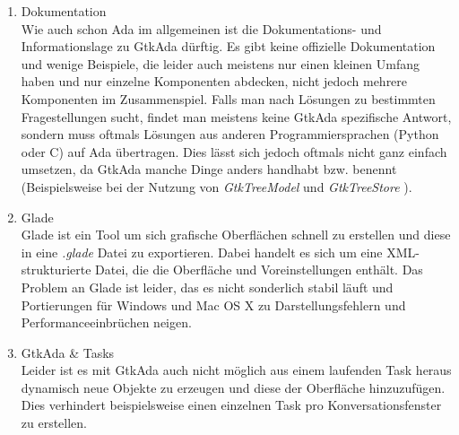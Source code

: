\documentclass[12pt,a4paper,bibliography=totocnumbered,listof=totocnumbered]{scrartcl}
\begin{document}
\begin{enumerate}
	\item Dokumentation	\hfill \\
	Wie auch schon Ada im allgemeinen ist die Dokumentations- und Informationslage zu GtkAda dürftig. Es gibt keine offizielle Dokumentation und wenige Beispiele, die leider auch meistens nur einen kleinen Umfang haben und nur einzelne Komponenten abdecken, nicht jedoch mehrere Komponenten im Zusammenspiel. Falls man nach Lösungen zu bestimmten Fragestellungen sucht, findet man meistens keine GtkAda spezifische Antwort, sondern muss oftmals Lösungen aus anderen Programmiersprachen (Python oder C) auf Ada übertragen. Dies lässt sich jedoch oftmals nicht ganz einfach umsetzen, da GtkAda manche Dinge anders handhabt bzw. benennt (Beispielsweise bei der Nutzung von \textit{Gtk\textunderscore Tree\textunderscore Model} und \textit{Gtk\textunderscore Tree\textunderscore Store}  ).
	\item Glade \hfill \\
	Glade ist ein Tool um sich grafische Oberflächen schnell zu erstellen und diese in eine \textit{.glade} Datei zu exportieren. Dabei handelt es sich um eine XML-strukturierte Datei, die die Oberfläche und Voreinstellungen enthält. Das Problem an Glade ist leider, das es nicht sonderlich stabil läuft und Portierungen für Windows und Mac OS X zu Darstellungsfehlern und Performanceeinbrüchen neigen.
	\item GtkAda \& Tasks \hfill \\
	Leider ist es mit GtkAda auch nicht möglich aus einem laufenden Task heraus dynamisch neue Objekte zu erzeugen und diese der Oberfläche hinzuzufügen. Dies verhindert beispielsweise einen einzelnen Task pro Konversationsfenster zu erstellen.
	
	\end{enumerate}


\pagebreak



\renewcommand\refname{Quellenverzeichnis}

%
%
\end{document}
